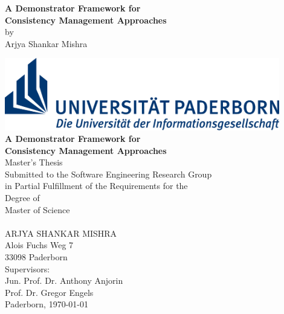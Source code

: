 \documentclass[%
				12pt,
				a4paper,
				twoside,
				titlepage,
				headsepline,
				numbers=noenddot,
				listof=totoc,
				index=totoc,
				bibliography=totoc]{scrartcl}
\theoremstyle{definition}
\begin{document}
    
	
	\setcounter{page}{1}
	{
		\thispagestyle{empty}
		\begin{center}
			{\vspace*{170pt}\Large\textbf{A Demonstrator Framework for\\[5pt] 
					Consistency Management Approaches}}\\[30pt]
			by\\[15pt]
			{\large Arjya Shankar Mishra}
		\end{center}
		\clearpage
		
		\thispagestyle{empty}          
		\begin{center}
				
		\end{center}
		\clearpage
	}  

	\begin{titlepage}
	\thispagestyle{empty}
	\begin{center}

			\includegraphics[width=12cm]{figures/Logo_Uni_Paderborn}\\
                      
      		\vspace{3cm}
			{\LARGE  \textbf{A Demonstrator Framework for\\ [7pt]
					Consistency Management Approaches}} \\ 
			\vspace{0,7cm}
			{\Large Master's Thesis }\\[6pt]
			Submitted to the Software Engineering Research Group\\
			in Partial Fulfillment of the Requirements for the\\
			Degree of\\[6pt]
			{\Large Master of Science}\\
			\vspace{30pt}
			 \\[4pt]
			{\large ARJYA SHANKAR MISHRA}\\
			Alois Fuchs Weg 7\\
			33098 Paderborn\\ 	
			\vspace{50pt}
			Supervisors:\\[2pt]
			{\large Jun. Prof. Dr. Anthony Anjorin}\\[5pt]
			{\large Prof. Dr. Gregor Engels}\\
			\vspace{50pt}
			{Paderborn, \today}
					
	\end{center}
	\end{titlepage}
	\clearpage
	
\end{document}
